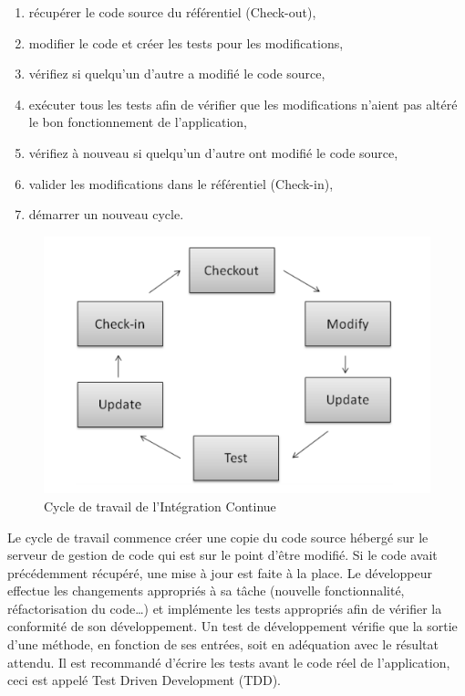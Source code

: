 \documentclass{report}
\begin{document}
      \begin{enumerate}
        \item récupérer le code source du référentiel (Check-out),
        \item modifier le code et créer les tests pour les modifications,
        \item vérifiez si quelqu'un d'autre a modifié le code source,
        \item exécuter tous les tests afin de vérifier que les modifications n’aient pas altéré le bon fonctionnement de l’application,
        \item vérifiez à nouveau si quelqu'un d'autre ont modifié le code source,
        \item valider les modifications dans le référentiel (Check-in),
        \item démarrer un nouveau cycle.\\
      \end{enumerate}

      \begin{figure}
        \begin{center}
          \includegraphics[scale=0.5]{images/ICWorkflow.png}
        \end{center}
        \caption{Cycle de travail de l’Intégration Continue}
        \label{IC workflow}
      \end{figure}

      Le cycle de travail commence créer une copie du code source hébergé sur le serveur de gestion de code qui est sur le point d'être modifié. Si le code avait précédemment récupéré, une mise à jour est faite à la place. Le développeur effectue les changements appropriés à sa tâche (nouvelle fonctionnalité, réfactorisation du code…) et implémente les tests appropriés afin de vérifier la conformité de son développement. Un test de développement vérifie que la sortie d’une méthode, en fonction de ses entrées, soit en adéquation avec le résultat attendu. Il est recommandé d’écrire les tests avant le code réel de l’application, ceci est appelé Test Driven Development (TDD).\\
\end{document}
